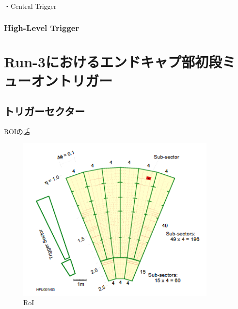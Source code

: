 ・Central Trigger
\subsubsection{High-Level Trigger}


\section{Run-3におけるエンドキャプ部初段ミューオントリガー}

\subsection{トリガーセクター}
ROIの話
\begin{figure}[tb]
  \centering
  \includegraphics[clip, width=10cm]{fig/3/RoI.png}
  \caption{RoI}
  \label{fig:RoI}
\end{figure}



